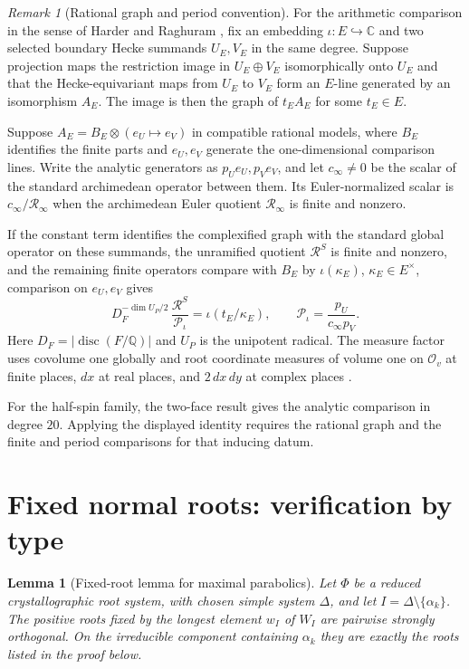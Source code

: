 \documentclass[12pt]{amsart}
\numberwithin{equation}{section}
\theoremstyle{plain}
\newtheorem{lemma}[theorem]{Lemma}
\theoremstyle{definition}
\theoremstyle{remark}
\newtheorem{remark}[theorem]{Remark}
\newcommand{\Q}{\mathbb Q}
\newcommand{\C}{\mathbb C}
\begin{document}
\begin{remark}[Rational graph and period convention]\label{rem:rational-graph}
For the arithmetic comparison in the sense of Harder and Raghuram \cite[Chs.~6--7]{HarderRaghuram2020}, fix an embedding $\iota:E\hookrightarrow\C$ and two selected boundary Hecke summands $U_E,V_E$ in the same degree. Suppose projection maps the restriction image in $U_E\oplus V_E$ isomorphically onto $U_E$ and that the Hecke-equivariant maps from $U_E$ to $V_E$ form an $E$-line generated by an isomorphism $A_E$. The image is then the graph of $t_E A_E$ for some $t_E\in E$.

Suppose $A_E=B_E\otimes(e_U\mapsto e_V)$ in compatible rational models, where $B_E$ identifies the finite parts and $e_U,e_V$ generate the one-dimensional comparison lines. Write the analytic generators as $p_Ue_U,p_Ve_V$, and let $c_\infty\ne0$ be the scalar of the standard archimedean operator between them. Its Euler-normalized scalar is $c_\infty/\mathcal R_\infty$ when the archimedean Euler quotient $\mathcal R_\infty$ is finite and nonzero.

If the constant term identifies the complexified graph with the standard global operator on these summands, the unramified quotient $\mathcal R^S$ is finite and nonzero, and the remaining finite operators compare with $B_E$ by $\iota(\kappa_E)$, $\kappa_E\in E^\times$, comparison on $e_U,e_V$ gives 
\[
 D_F^{-\dim U_P/2}\,\frac{\mathcal R^S}{\mathcal P_\iota}
 =\iota(t_E/\kappa_E),\qquad
 \mathcal P_\iota=\frac{p_U}{c_\infty p_V}.
\]
Here $D_F=|\operatorname{disc}(F/\Q)|$ and $U_P$ is the unipotent radical. The measure factor uses covolume one globally and root coordinate measures of volume one on $\mathcal O_v$ at finite places, $dx$ at real places, and $2\,dx\,dy$ at complex places \cite[\S5.2.3, (5.12)--(5.14)]{Raghuram2025}. 

For the half-spin family, the two-face result gives the analytic comparison in degree $20$. Applying the displayed identity requires the rational graph and
the finite and period comparisons for that inducing datum.
\end{remark}

\appendix
\section{Fixed normal roots: verification by type}\label{app:fixed-roots}
\begin{lemma}[Fixed-root lemma for maximal parabolics]
\label{lem:fixed-roots-strongly-orthogonal}
Let $\Phi$ be a reduced crystallographic root system, with chosen simple
system $\Delta$, and let $I=\Delta\setminus\{\alpha_k\}$. The positive roots
fixed by the longest element $w_I$ of $W_I$ are pairwise strongly
orthogonal. On the irreducible component containing $\alpha_k$ they are
exactly the roots listed in the proof below.
\end{lemma}
\end{document}

